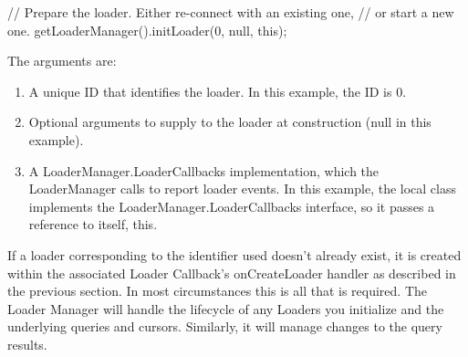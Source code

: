 \begin{android}
// Prepare the loader.  Either re-connect with an existing one,
// or start a new one.
getLoaderManager().initLoader(0, null, this);      
\end{android}
The arguments are:
\begin{enumerate}
	\item A unique ID that identifies the loader. In this example, the ID is 0.
	\item Optional arguments to supply to the loader at construction (null in this example).
	\item A LoaderManager.LoaderCallbacks implementation, which the LoaderManager calls to report loader events. In this example, the local class implements the LoaderManager.LoaderCallbacks interface, so it passes a reference to itself, this.
\end{enumerate}

If a loader corresponding to the identifier used doesn’t already exist, it is created within the associated Loader Callback’s onCreateLoader handler as described in the previous section. In most circumstances this is all that is required. The Loader Manager will handle the lifecycle of any Loaders you initialize and the underlying queries and cursors. Similarly, it will manage changes to the query results.